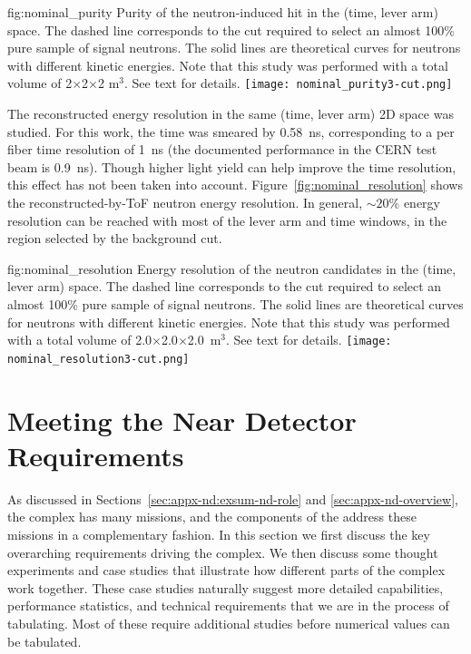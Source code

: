 \begin{dunefigure}{fig:nominal_purity}
{Purity of the neutron-induced hit in the (time, lever arm) space.
The dashed line corresponds to the cut required to select an almost 100\% pure sample of signal neutrons. The solid lines are theoretical curves for neutrons with different kinetic energies.
Note that this study was performed with a total volume of 2$\times$2$\times$2 m$^3$.
See text for details.}
  \texttt{[image: nominal\_purity3-cut.png]}
\end{dunefigure}

The reconstructed energy resolution in the same (time, lever arm) 2D space was studied. For this work, the time was smeared by 0.58~ns, corresponding to a per fiber time resolution of 1~ns (the documented performance in the CERN test beam is 0.9~ns).
Though higher light yield can help improve the time resolution, this effect has not been taken into account. Figure~\ref{fig:nominal_resolution} shows the reconstructed-by-ToF neutron energy resolution. In general, $\sim 20 \%$ energy resolution can be reached with most of the lever arm and time windows, 
in the region selected by the background cut. \\

\begin{dunefigure}{fig:nominal_resolution}
{Energy resolution of the neutron candidates in the (time, lever arm) space. 
The dashed line corresponds to the cut required to select an almost 100\% pure sample of signal neutrons. The solid lines are theoretical curves for neutrons with different kinetic energies.
Note that this study was performed with a total volume of 2.0$\times$2.0$\times$2.0~m$^3$.
See text for details.}
  \texttt{[image: nominal\_resolution3-cut.png]}
\end{dunefigure}


\section{Meeting the Near Detector Requirements}
\label{sec:appx-nd:requirements}

As discussed in Sections~\ref{sec:appx-nd:exsum-nd-role} and \ref{sec:appx-nd-overview}, the    complex has many missions, and the components of the    address these missions in a complementary fashion. In this section we first discuss the key overarching requirements driving the  complex. We then discuss some thought experiments and case studies that illustrate how different parts of the complex work together. These case studies naturally suggest more detailed capabilities, performance statistics, and technical requirements that we are in the process of tabulating.  Most of these require additional studies before numerical values can be tabulated.



